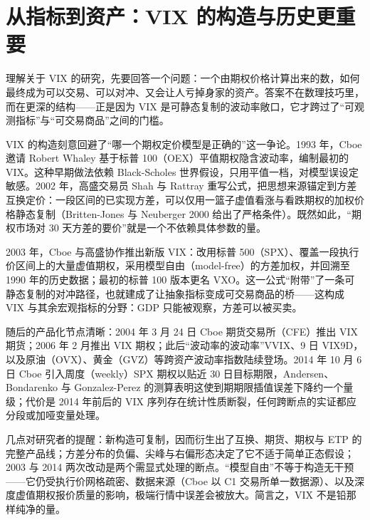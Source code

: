 \documentclass[11pt,a4paper]{ctexart}
\begin{document}
\section{从指标到资产：VIX 的构造与历史更重要}

理解关于 VIX 的研究，先要回答一个问题：一个由期权价格计算出来的数，如何最终成为可以交易、可以对冲、又会让人亏掉身家的资产。答案不在数理技巧里，而在更深的结构——正是因为 VIX 是可静态复制的波动率敞口，它才跨过了“可观测指标”与“可交易商品”之间的门槛。

VIX 的构造刻意回避了“哪一个期权定价模型是正确的”这一争论。1993 年，Cboe 邀请 Robert Whaley 基于标普 100（OEX）平值期权隐含波动率，编制最初的 VIX。这种早期做法依赖 Black-Scholes 世界假设，只用平值一档，对模型误设定敏感。2002 年，高盛交易员 Shah 与 Rattray 重写公式，把思想来源锚定到方差互换定价：一段区间的已实现方差，可以仅用一篮子虚值看涨与看跌期权的加权价格静态复制（Britten-Jones 与 Neuberger 2000 给出了严格条件）。既然如此，“期权市场对 30 天方差的要价”就是一个不依赖具体参数的量。

2003 年，Cboe 与高盛协作推出新版 VIX：改用标普 500（SPX）、覆盖一段执行价区间上的大量虚值期权，采用模型自由（model-free）的方差加权，并回溯至 1990 年的历史数据；最初的标普 100 版本更名 VXO。这一公式“附带”了一条可静态复制的对冲路径，也就建成了让抽象指标变成可交易商品的桥——这构成 VIX 与其余宏观指标的分野：GDP 只能被观察，方差可以被买卖。

随后的产品化节点清晰：2004 年 3 月 24 日 Cboe 期货交易所（CFE）推出 VIX 期货；2006 年 2 月推出 VIX 期权；此后“波动率的波动率”VVIX、9 日 VIX9D，以及原油（OVX）、黄金（GVZ）等跨资产波动率指数陆续登场。2014 年 10 月 6 日 Cboe 引入周度（weekly）SPX 期权以贴近 30 日目标期限，Andersen、Bondarenko 与 Gonzalez-Perez 的测算表明这使到期期限插值误差下降约一个量级；代价是 2014 年前后的 VIX 序列存在统计性质断裂，任何跨断点的实证都应分段或加哑变量处理。

几点对研究者的提醒：新构造可复制，因而衍生出了互换、期货、期权与 ETP 的完整产品线；方差分布的负偏、尖峰与右偏形态决定了它不适于简单正态假设；2003 与 2014 两次改动是两个需显式处理的断点。“模型自由”不等于构造无干预——它仍受执行价网格疏密、数据来源（Cboe 以 C1 交易所单一数据源）、以及深度虚值期权报价质量的影响，极端行情中误差会被放大。简言之，VIX 不是铅那样纯净的量。
\end{document}
